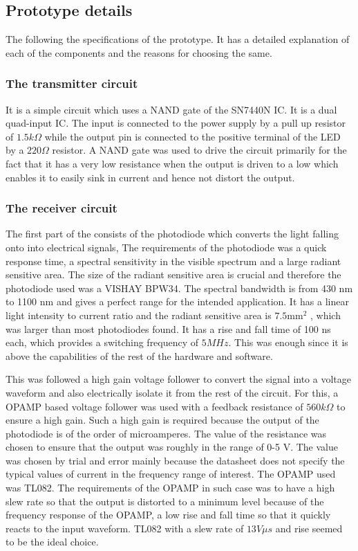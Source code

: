 \documentclass{article}
\begin{document}
\subsection{Prototype details}
The following the specifications of the prototype. It has a detailed explanation of each of the components and the reasons for choosing the same.

\subsubsection{The transmitter circuit}
It is a simple circuit which uses a NAND gate of the SN7440N IC. It is a dual quad-input IC. The input is connected to the power supply by a pull up resistor of $1.5k \Omega$ while the output pin is connected to the positive terminal of the LED by a $220 \Omega $ resistor. A NAND gate was used to drive the circuit primarily for the fact that it has a very low resistance when the output is driven to a low which enables it to easily sink in current and hence not distort the output. 
\subsubsection{The receiver circuit}
The first part of the consists of the photodiode which converts the light falling onto into electrical signals, The requirements of the photodiode was a quick response time, a spectral sensitivity in the visible spectrum and a large radiant sensitive area. The size of the
radiant sensitive area is crucial and therefore the photodiode used was a VISHAY BPW34. The spectral bandwidth is from 430 nm to 1100 nm and gives a perfect range for the intended application. It has a linear light intensity to current ratio and the radiant sensitive area is $7.5 \text{mm}^2$ , which was larger than most photodiodes found. It has a rise
and fall time of 100 ns each, which provides a switching frequency of $5 MHz$. This was enough since it is above the capabilities of the rest of the hardware and software.

This was followed a high gain voltage follower to convert the signal into a voltage waveform and also electrically isolate it from the rest of the circuit. For this, a OPAMP based voltage follower was used with a feedback resistance of $560 k \Omega$ to ensure a high gain. Such a high gain is required because the output of the photodiode is of the order of microamperes. The value of the resistance was chosen to ensure that the output was roughly in the range of 0-5 V. The value was chosen by trial and error mainly because the datasheet does not specify the typical values of current in the frequency range of interest. The OPAMP used was TL082. The requirements of the OPAMP in such case was to have a high slew rate so that the output is distorted to a minimum level because of the frequency response of the OPAMP, a low rise and fall time so that it quickly reacts to the input waveform. TL082 with a slew rate of $13 V\mu s$ and rise  seemed to be the ideal choice.
\end{document}
